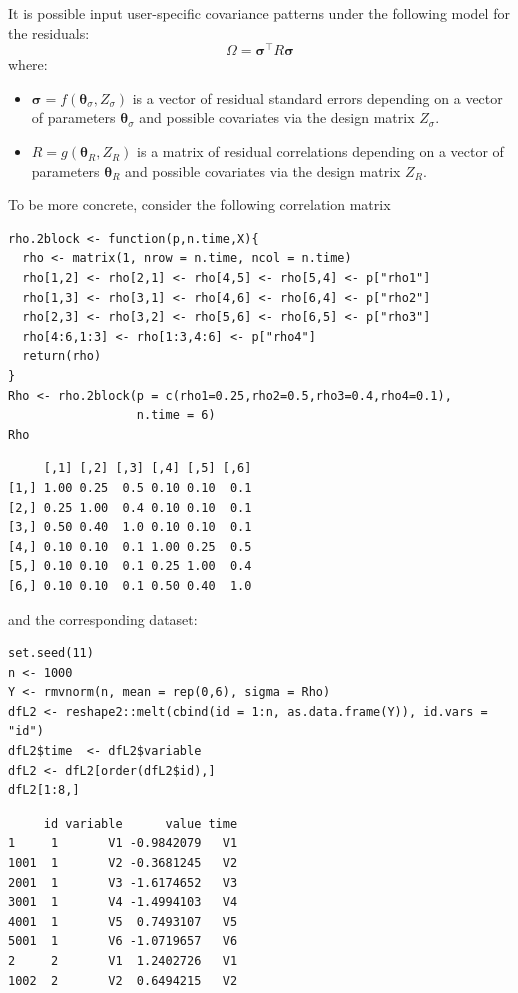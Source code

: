\documentclass[12pt]{article}
\newcommand\trans[1]{{#1}^\intercal}%
\begin{document}
It is possible input user-specific covariance patterns under the
following model for the residuals: \[\Omega =
\trans{\boldsymbol{\sigma}} R \boldsymbol{\sigma}\] where:
\begin{itemize}
\item \(\boldsymbol{\sigma}=f(\boldsymbol{\theta}_{\sigma},Z_{\sigma})\)
is a vector of residual standard errors depending on a vector of
parameters \(\boldsymbol{\theta}_{\sigma}\) and possible covariates
via the design matrix \(Z_{\sigma}\).
\item \(R=g(\boldsymbol{\theta}_{R},Z_R)\) is a matrix of residual
correlations depending on a vector of parameters
\(\boldsymbol{\theta}_{R}\) and possible covariates via the design
matrix \(Z_R\).
\end{itemize}

\bigskip

To be more concrete, consider the following correlation matrix
\lstset{language=r,label= ,caption= ,captionpos=b,numbers=none}
\begin{lstlisting}
rho.2block <- function(p,n.time,X){
  rho <- matrix(1, nrow = n.time, ncol = n.time)
  rho[1,2] <- rho[2,1] <- rho[4,5] <- rho[5,4] <- p["rho1"]
  rho[1,3] <- rho[3,1] <- rho[4,6] <- rho[6,4] <- p["rho2"]
  rho[2,3] <- rho[3,2] <- rho[5,6] <- rho[6,5] <- p["rho3"]
  rho[4:6,1:3] <- rho[1:3,4:6] <- p["rho4"]
  return(rho)
}
Rho <- rho.2block(p = c(rho1=0.25,rho2=0.5,rho3=0.4,rho4=0.1),
                  n.time = 6)
Rho
\end{lstlisting}

\begin{verbatim}
     [,1] [,2] [,3] [,4] [,5] [,6]
[1,] 1.00 0.25  0.5 0.10 0.10  0.1
[2,] 0.25 1.00  0.4 0.10 0.10  0.1
[3,] 0.50 0.40  1.0 0.10 0.10  0.1
[4,] 0.10 0.10  0.1 1.00 0.25  0.5
[5,] 0.10 0.10  0.1 0.25 1.00  0.4
[6,] 0.10 0.10  0.1 0.50 0.40  1.0
\end{verbatim}


and the corresponding dataset:
\lstset{language=r,label= ,caption= ,captionpos=b,numbers=none}
\begin{lstlisting}
set.seed(11)
n <- 1000
Y <- rmvnorm(n, mean = rep(0,6), sigma = Rho)
dfL2 <- reshape2::melt(cbind(id = 1:n, as.data.frame(Y)), id.vars = "id")
dfL2$time  <- dfL2$variable
dfL2 <- dfL2[order(dfL2$id),]
dfL2[1:8,]
\end{lstlisting}

\begin{verbatim}
     id variable      value time
1     1       V1 -0.9842079   V1
1001  1       V2 -0.3681245   V2
2001  1       V3 -1.6174652   V3
3001  1       V4 -1.4994103   V4
4001  1       V5  0.7493107   V5
5001  1       V6 -1.0719657   V6
2     2       V1  1.2402726   V1
1002  2       V2  0.6494215   V2
\end{verbatim}
\end{document}
